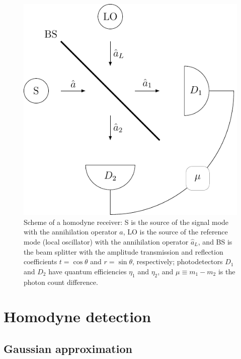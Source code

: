 \documentclass[%
reprint,
superscriptaddress,
 amsmath,amssymb,amsfonts,
 aps,
 pra,
 longbibliography
]{revtex4-2}
\begin{document}
\begin{figure}
    \centering
    \includegraphics[width=0.9\linewidth]{pics/schemes/homodyne.pdf}
    \caption{Scheme of a homodyne receiver: S is the source of the
      signal mode with the annihilation operator $\hat{a}$,
      LO is the source of the reference mode (local oscillator) with the annihilation
      operator $\hat{a}_{L}$, and BS is the beam splitter with
      the amplitude transmission and reflection coefficients
      $t=\cos\theta$ and $r=\sin\theta$, respectively; photodetectors $D_1$ and $D_2$ have quantum efficiencies
     $\eta_{1}$ and $\eta_{2}$, and $\mu\equiv m_1-m_2$ is the photon count
      difference.}
    \label{fig:homodyne}
\end{figure}

\section{Homodyne detection}
\label{sec:homodyne} 

\subsection{Gaussian approximation}
\label{subsec:gauss-hom}
\end{document}
